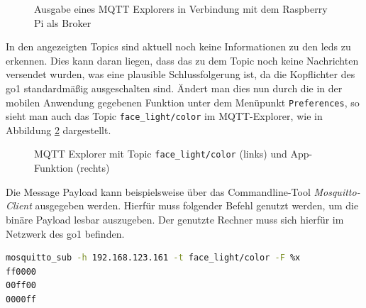 \begin{figure}[h]
    \caption{Ausgabe eines MQTT Explorers in Verbindung mit dem Raspberry Pi als Broker}\label{fig:mqtt-explorer}
\end{figure}

In den angezeigten Topics sind aktuell noch keine Informationen zu den \glspl{led} zu erkennen.
Dies kann daran liegen, dass das zu dem Topic noch keine Nachrichten versendet wurden, was eine plausible Schlussfolgerung
ist, da die Kopflichter des \gls{go1} standardmäßig ausgeschalten sind.
Ändert man dies nun durch die in der mobilen Anwendung gegebenen Funktion unter dem Menüpunkt \texttt{Preferences}, so
sieht man auch das Topic \texttt{face\_light/color} im MQTT-Explorer, wie in Abbildung \ref{fig:app-mqtt-facelight} dargestellt.

\begin{figure}[h]
    \caption{MQTT Explorer mit Topic \texttt{face\_light/color} (links) und App-Funktion (rechts)}\label{fig:app-mqtt-facelight}
\end{figure}

Die Message Payload kann beispielsweise über das Commandline-Tool \emph{Mosquitto-Client} ausgegeben werden.
Hierfür muss folgender Befehl genutzt werden, um die binäre Payload lesbar auszugeben.
Der genutzte Rechner muss sich hierfür im Netzwerk des \gls{go1} befinden.

\begin{lstlisting}[language=Bash]
mosquitto_sub -h 192.168.123.161 -t face_light/color -F %x
ff0000
00ff00
0000ff
\end{lstlisting}

